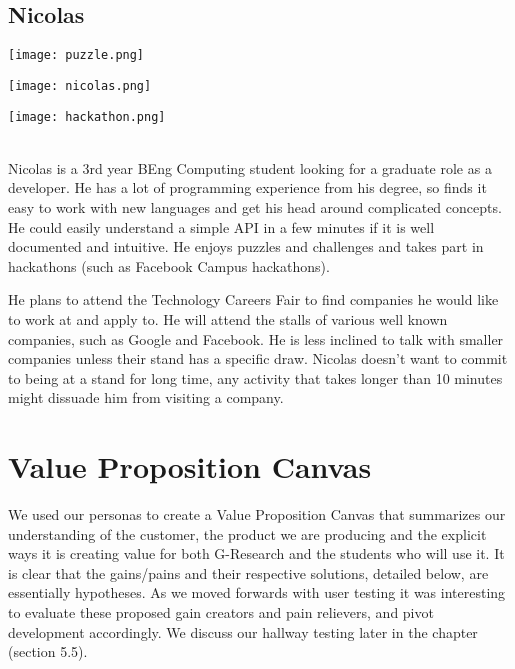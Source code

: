 \subsection{Nicolas}

\begin{minipage}{.333\textwidth}
  \centering
  \texttt{[image: puzzle.png]}
\end{minipage}%
\begin{minipage}{.333\textwidth}
  \centering
  \texttt{[image: nicolas.png]}
\end{minipage}
\begin{minipage}{.333\textwidth}
  \centering
  \texttt{[image: hackathon.png]}
\end{minipage}\\

Nicolas is a 3rd year BEng Computing student looking for a graduate role as a developer. He has a lot of programming experience from his degree, so finds it easy to work with new languages and get his head around complicated concepts. He could easily understand a simple API in a few minutes if it is well documented and intuitive. He enjoys puzzles and challenges and takes part in hackathons (such as Facebook Campus hackathons).

He plans to attend the Technology Careers Fair to find companies he would like to work at and apply to. He will attend the stalls of various well known companies, such as Google and Facebook. He is less inclined to talk with smaller companies unless their stand has a specific draw. Nicolas doesn't want to commit to being at a stand for long time, any activity that takes longer than 10 minutes might dissuade him from visiting a company. 

\section{Value Proposition Canvas}
We used our personas to create a Value Proposition Canvas that summarizes our understanding of the customer, the product we are producing and the explicit ways it is creating value for both G-Research and the students who will use it. It is clear that the gains/pains and their respective solutions, detailed below, are essentially hypotheses. As we moved forwards with user testing it was interesting to evaluate these proposed gain creators and pain relievers, and pivot development accordingly. We discuss our hallway testing later in the chapter (section 5.5). 

